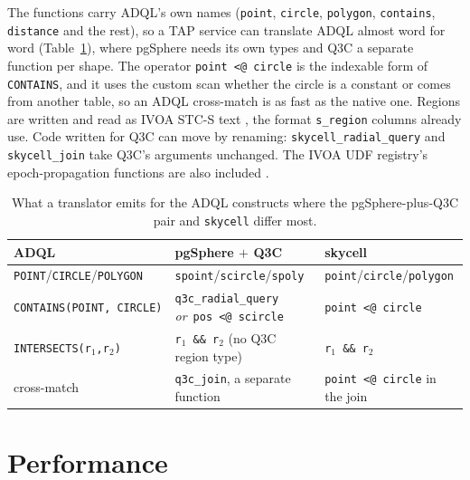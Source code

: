 \documentclass[preprint,12pt]{elsarticle}
\begin{document}
The functions carry ADQL's own names (\texttt{point}, \texttt{circle},
\texttt{polygon}, \texttt{contains}, \texttt{distance} and the rest), so a TAP service
can translate ADQL almost word for word (Table~\ref{tab:ops}), where pgSphere needs its
own types and Q3C a separate function per shape. The operator
\texttt{point <@ circle} is the indexable form of \texttt{CONTAINS}, and it uses the
custom scan whether the circle is a constant or comes from another table, so an ADQL
cross-match is as fast as the native one. Regions are written and read as IVOA STC-S
text \citep{stc}, the format \texttt{s\_region} columns already use. Code written for
Q3C can move by renaming: \texttt{skycell\_radial\_query} and \texttt{skycell\_join}
take Q3C's arguments unchanged. The IVOA UDF registry's epoch-propagation functions are also
included \citep{hipparcos}.

\begin{table}
  \caption{What a translator emits for the ADQL constructs where the pgSphere-plus-Q3C
    pair and \texttt{skycell} differ most.}
  \label{tab:ops}
  \centering
  \footnotesize
  \begin{tabular}{@{}p{} p{} p{}@{}}
    \hline\hline
    ADQL & pgSphere $+$ Q3C & skycell \\
    \hline
    \texttt{POINT}\allowbreak/\allowbreak\texttt{CIRCLE}\allowbreak/\allowbreak\texttt{POLYGON} &
      \texttt{spoint}\allowbreak/\allowbreak\texttt{scircle}\allowbreak/\allowbreak\texttt{spoly} &
      \texttt{point}\allowbreak/\allowbreak\texttt{circle}\allowbreak/\allowbreak\texttt{polygon} \\[2pt]
    \texttt{CONTAINS(}\allowbreak\texttt{POINT,}\allowbreak\ \texttt{CIRCLE)} &
      \texttt{q3c\_radial\_query} \emph{or}\allowbreak\ \texttt{pos <@ scircle} &
      \texttt{point <@ circle} \\[2pt]
    \texttt{INTERSECTS(}\allowbreak\texttt{r$_1$,}\allowbreak\texttt{r$_2$)} &
      \texttt{r$_1$ \&\& r$_2$} (no Q3C region type) &
      \texttt{r$_1$ \&\& r$_2$} \\[2pt]
    cross-match &
      \texttt{q3c\_join}, a separate function &
      \texttt{point <@ circle} in the join \\[2pt]
    \hline
  \end{tabular}
\end{table}

\section{Performance}
\label{sec:tests}
\end{document}
